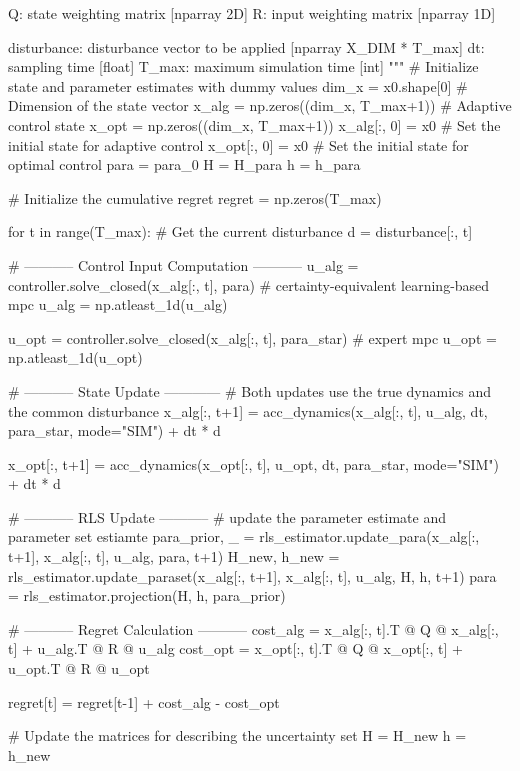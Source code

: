         Q: state weighting matrix [nparray 2D]
        R: input weighting matrix [nparray 1D]
        
        disturbance: disturbance vector to be applied [nparray X_DIM * T_max]
        dt: sampling time [float]
        T_max: maximum simulation time [int]
    """
    # Initialize state and parameter estimates with dummy values
    dim_x = x0.shape[0]  # Dimension of the state vector
    x_alg = np.zeros((dim_x, T_max+1))  # Adaptive control state
    x_opt = np.zeros((dim_x, T_max+1))
    x_alg[:, 0] = x0  # Set the initial state for adaptive control
    x_opt[:, 0] = x0  # Set the initial state for optimal control
    para = para_0
    H = H_para
    h = h_para

    # Initialize the cumulative regret
    regret = np.zeros(T_max)

    for t in range(T_max):
        # Get the current disturbance
        d = disturbance[:, t]

        # ----------- Control Input Computation -----------
        u_alg = controller.solve_closed(x_alg[:, t], para) # certainty-equivalent learning-based mpc
        u_alg = np.atleast_1d(u_alg)
        
        u_opt = controller.solve_closed(x_alg[:, t], para_star) # expert mpc
        u_opt = np.atleast_1d(u_opt)

        # ----------- State Update ------------
        # Both updates use the true dynamics and the common disturbance
        x_alg[:, t+1] = acc_dynamics(x_alg[:, t], u_alg, dt, para_star, mode="SIM") + dt * d

        x_opt[:, t+1] = acc_dynamics(x_opt[:, t], u_opt, dt, para_star, mode="SIM") + dt * d

        # ----------- RLS Update -----------
        # update the parameter estimate and parameter set estiamte
        para_prior, _ = rls_estimator.update_para(x_alg[:, t+1], x_alg[:, t], u_alg, para, t+1)
        H_new, h_new = rls_estimator.update_paraset(x_alg[:, t+1], x_alg[:, t], u_alg, H, h, t+1)
        para = rls_estimator.projection(H, h, para_prior)

        # ----------- Regret Calculation -----------
        cost_alg = x_alg[:, t].T @ Q @ x_alg[:, t] + u_alg.T @ R @ u_alg
        cost_opt = x_opt[:, t].T @ Q @ x_opt[:, t] + u_opt.T @ R @ u_opt

        regret[t] = regret[t-1] + cost_alg - cost_opt

        # Update the matrices for describing the uncertainty set
        H = H_new
        h = h_new

